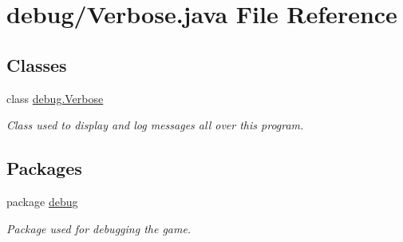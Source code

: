 \hypertarget{a00042}{\section{debug/\-Verbose.java File Reference}
\label{a00042}
}
\subsection*{Classes}
\begin{DoxyCompactItemize}
\item 
class \hyperlink{a00035}{debug.\-Verbose}
\begin{DoxyCompactList}\small\item\em Class used to display and log messages all over this program. \end{DoxyCompactList}\end{DoxyCompactItemize}
\subsection*{Packages}
\begin{DoxyCompactItemize}
\item 
package \hyperlink{a00080}{debug}
\begin{DoxyCompactList}\small\item\em Package used for debugging the game. \end{DoxyCompactList}\end{DoxyCompactItemize}
